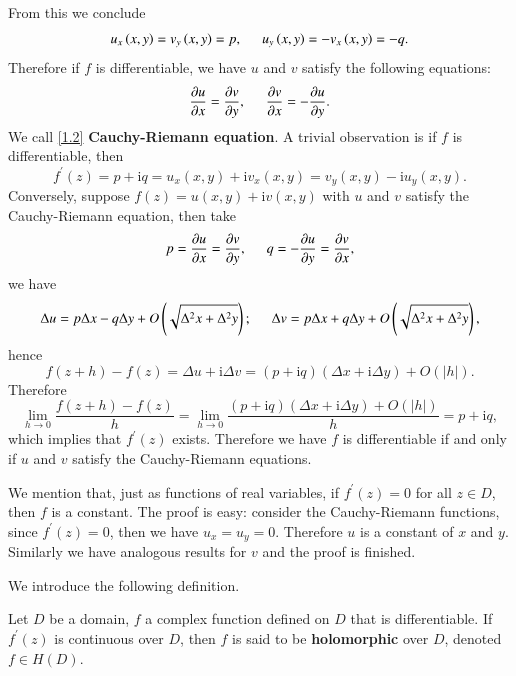 From this we conclude 
$$
u_x\left( x,y \right) =v_y\left( x,y \right) =p,\hspace{0.5cm}u_y\left( x,y \right) =-v_x\left( x,y \right) =-q.
$$
Therefore if $f$ is differentiable, we have $u$ and $v$ satisfy the following equations: 
\begin{equation}\label{1.2}
\frac{\partial u}{\partial x}=\frac{\partial v}{\partial y},\hspace{0.5cm}\frac{\partial v}{\partial x}=-\frac{\partial u}{\partial y}.
\end{equation}
We call \eqref{1.2} \textbf{Cauchy-Riemann equation}. A trivial observation is if $f$ is differentiable, then 
$$
f^{\prime}\left( z \right) =p+\mathrm{i}q=u_x\left( x,y \right) +\mathrm{i}v_x\left( x,y \right) =v_y\left( x,y \right) -\mathrm{i}u_y\left( x,y \right) .
$$
Conversely, suppose $f(z)=u(x,y)+\mathrm{i}v(x,y)$ with $u$ and $v$ satisfy the Cauchy-Riemann equation, then take 
$$
p=\frac{\partial u}{\partial x}=\frac{\partial v}{\partial y},\hspace{0.5cm}q=-\frac{\partial u}{\partial y}=\frac{\partial v}{\partial x},
$$
we have 
$$
\Delta u=p\Delta x-q\Delta y+O\left( \sqrt{\Delta ^2x+\Delta ^2y} \right) ;\hspace{0.5cm}\Delta v=p\Delta x+q\Delta y+O\left( \sqrt{\Delta ^2x+\Delta ^2y} \right) ,
$$
hence 
$$
f\left( z+h \right) -f\left( z \right) =\Delta u+\mathrm{i}\Delta v=\left( p+\mathrm{i}q \right) \left( \Delta x+\mathrm{i}\Delta y \right) +O\left( \left| h \right| \right) .
$$
Therefore 
$$
\lim_{h\rightarrow 0} \frac{f\left( z+h \right) -f\left( z \right)}{h}=\lim_{h\rightarrow 0} \frac{\left( p+\mathrm{i}q \right) \left( \Delta x+\mathrm{i}\Delta y \right) +O\left( \left| h \right| \right)}{h}=p+\mathrm{i}q,
$$
which implies that $f^\prime(z)$ exists. Therefore we have $f$ is differentiable if and only if $u$ and $v$ satisfy the Cauchy-Riemann equations.\par
We mention that, just as functions of real variables, if $f^\prime(z)=0$ for all $z\in D$, then $f$ is a constant. The proof is easy: consider the Cauchy-Riemann functions, since $f^\prime(z)=0$, then we have $u_x=u_y=0$. Therefore $u$ is a constant of $x$ and $y$. Similarly we have analogous results for $v$ and the proof is finished.\par
We introduce the following definition.
\begin{definition}
Let $D$ be a domain, $f$ a complex function defined on $D$ that is differentiable. If $f^\prime(z)$ is continuous over $D$, then $f$ is said to be \textbf{holomorphic} over $D$, denoted $f\in H(D)$.
\end{definition}
